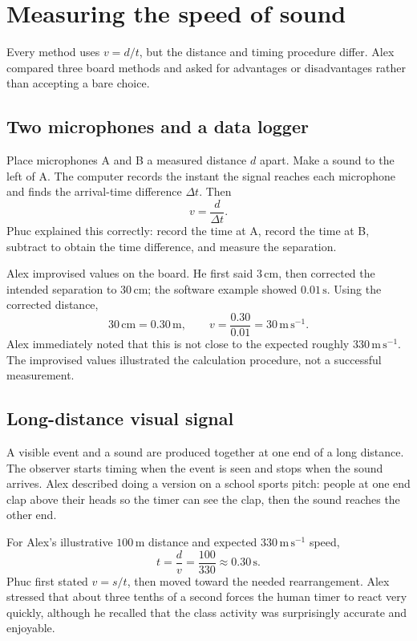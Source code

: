 \documentclass[11pt,a4paper]{article}
\begin{document}
\section{Measuring the speed of sound}
Every method uses $v=d/t$, but the distance and timing procedure differ. Alex compared three board methods and asked for advantages or disadvantages rather than accepting a bare choice.

\subsection{Two microphones and a data logger}
Place microphones A and B a measured distance $d$ apart. Make a sound to the left of A. The computer records the instant the signal reaches each microphone and finds the arrival-time difference $\Delta t$. Then
\[
v=\frac{d}{\Delta t}.
\]
Phuc explained this correctly: record the time at A, record the time at B, subtract to obtain the time difference, and measure the separation.

Alex improvised values on the board. He first said $3\,\mathrm{cm}$, then corrected the intended separation to $30\,\mathrm{cm}$; the software example showed $0.01\,\mathrm{s}$. Using the corrected distance,
\[
30\,\mathrm{cm}=0.30\,\mathrm{m},\qquad v=\frac{0.30}{0.01}=30\,\mathrm{m\,s^{-1}}.
\]
Alex immediately noted that this is not close to the expected roughly $330\,\mathrm{m\,s^{-1}}$. The improvised values illustrated the calculation procedure, not a successful measurement.

\subsection{Long-distance visual signal}
A visible event and a sound are produced together at one end of a long distance. The observer starts timing when the event is seen and stops when the sound arrives. Alex described doing a version on a school sports pitch: people at one end clap above their heads so the timer can see the clap, then the sound reaches the other end.

For Alex's illustrative $100\,\mathrm{m}$ distance and expected $330\,\mathrm{m\,s^{-1}}$ speed,
\[
t=\frac{d}{v}=\frac{100}{330}\approx0.30\,\mathrm{s}.
\]
Phuc first stated $v=s/t$, then moved toward the needed rearrangement. Alex stressed that about three tenths of a second forces the human timer to react very quickly, although he recalled that the class activity was surprisingly accurate and enjoyable.
\end{document}
